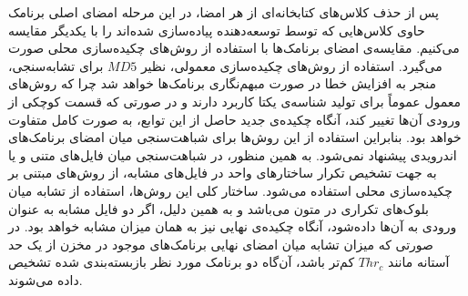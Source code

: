پس از حذف کلاس‌های کتابخانه‌ای از هر امضا، در این مرحله امضای اصلی برنامک حاوی کلاس‌هایی که توسط توسعه‌دهنده پیاده‌سازی شده‌اند را با یکدیگر مقایسه می‌کنیم. مقایسه‌ی امضای برنامک‌ها با استفاده از روش‌های چکیده‌سازی محلی صورت می‌گیرد. استفاده از روش‌های چکیده‌سازی معمولی، نظیر $MD5$ برای تشابه‌سنجی، منجر به افزایش خطا در صورت مبهم‌نگاری برنامک‌ها خواهد شد چرا که روش‌های معمول عموماً ‌برای تولید شناسه‌ی یکتا کاربرد دارند و در صورتی که قسمت کوچکی از ورودی آن‌ها تغییر کند، آنگاه چکیده‌ی جدید حاصل از این توابع، به صورت کامل متفاوت خواهد بود. بنابراین استفاده از این روش‌ها برای شباهت‌سنجی میان امضای برنامک‌های اندرویدی پیشنهاد نمی‌شود. به همین منظور، در شباهت‌سنجی میان فایل‌های متنی و یا به جهت تشخیص تکرار ساختار‌های واحد در فایل‌های مشابه، از روش‌های مبتنی بر چکیده‌سازی محلی استفاده می‌شود. ساختار کلی این روش‌ها، استفاده از تشابه میان بلوک‌های تکراری در متون می‌باشد و به همین دلیل، اگر دو فایل مشابه به عنوان ورودی به آن‌ها داده‌شود، آنگاه چکیده‌ی نهایی نیز به همان میزان مشابه خواهد بود. در صورتی که میزان تشابه میان امضای نهایی برنامک‌های موجود در مخزن از یک حد آستانه مانند $Thr_c$ کم‌تر باشد، آن‌گاه دو برنامک مورد نظر بازبسته‌بندی شده تشخیص داده می‌شوند.














